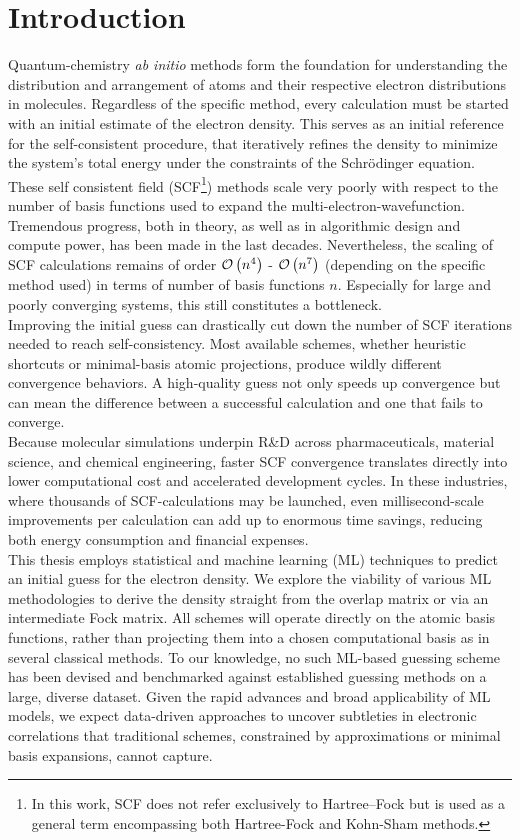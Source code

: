 \chapter{Introduction}
\label{sec:introduction}

Quantum-chemistry \textit{ab initio} methods form the foundation for understanding the distribution and arrangement of atoms and their respective electron distributions in molecules. Regardless of the specific method, every calculation must be started with an initial estimate of the electron density. This serves as an initial reference for the self-consistent procedure, that iteratively refines the density to minimize the system's total energy under the constraints of the Schrödinger equation. These self consistent field (SCF\footnote{In this work, SCF does not refer exclusively to Hartree–Fock but is used as a general term encompassing both Hartree-Fock and Kohn-Sham methods.}) methods scale very poorly with respect to the number of basis functions used to expand the multi-electron-wavefunction. Tremendous progress, both in theory, as well as in algorithmic design and compute power, has been made in the last decades. Nevertheless, the scaling of SCF calculations remains of order $\mathcal{O}\left(n^4\right)$ - $\mathcal{O}\left(n^7\right)$ (depending on the specific method used) in terms of number of basis functions $n$. Especially for large and poorly converging systems, this still constitutes a bottleneck. \\

Improving the initial guess can drastically cut down the number of SCF iterations needed to reach self-consistency. Most available schemes, whether heuristic shortcuts or minimal-basis atomic projections, produce wildly different convergence behaviors. A high-quality guess not only speeds up convergence but can mean the difference between a successful calculation and one that fails to converge.\\
Because molecular simulations underpin R\&D across pharmaceuticals, material science, and chemical engineering, faster SCF convergence translates directly into lower computational cost and accelerated development cycles. In these industries, where thousands of SCF-calculations may be launched, even millisecond-scale improvements per calculation can add up to enormous time savings, reducing both energy consumption and financial expenses. \\

This thesis employs statistical and machine learning (ML) techniques to predict an initial guess for the electron density. We explore the viability of various ML methodologies to derive the density straight from the overlap matrix or via an intermediate Fock matrix. All schemes will operate directly on the atomic basis functions, rather than projecting them into a chosen computational basis as in several classical methods. To our knowledge, no such ML-based guessing scheme has been devised and benchmarked against established guessing methods on a large, diverse dataset. Given the rapid advances and broad applicability of ML models, we expect data-driven approaches to uncover subtleties in electronic correlations that traditional schemes, constrained by approximations or minimal basis expansions, cannot capture.\\

